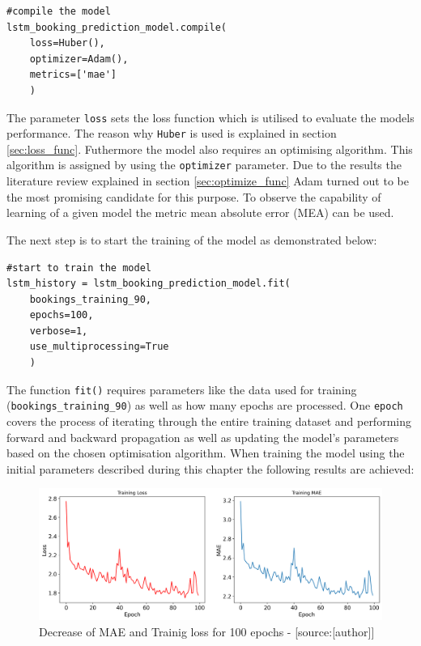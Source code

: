 \begin{lstlisting}
#compile the model 
lstm_booking_prediction_model.compile(
    loss=Huber(),
    optimizer=Adam(),
    metrics=['mae']
	)
\end{lstlisting}
The parameter \verb|loss| sets the loss function which is utilised to evaluate the models performance. The reason why \verb|Huber| is used is explained in section \ref{sec:loss_func}. Futhermore the model also requires an optimising algorithm. This algorithm is assigned by using the \verb|optimizer| parameter. Due to the results the literature review explained in section \ref{sec:optimize_func} Adam turned out to be the most promising candidate for this purpose. To observe the capability of learning of a given model the metric mean absolute error (MEA) can be used. 

The next step is to start the training of the model as demonstrated below:
\begin{lstlisting}
#start to train the model
lstm_history = lstm_booking_prediction_model.fit(
    bookings_training_90,
    epochs=100,
    verbose=1,
    use_multiprocessing=True
	)
\end{lstlisting}
The function \verb|fit()| requires parameters like the data used for training (\verb|bookings_training_90|) as well as how many epochs are processed. One \verb|epoch| covers the process of iterating through the entire training dataset and performing forward and backward propagation as well as updating the model's parameters based on the chosen optimisation algorithm.
\newline
When training the model using the initial parameters described during this chapter the following results are achieved:
\begin{figure}[H]
	\centering
		\includegraphics[width=14cm]{images/lstm_1_paper_training}
	\caption{Decrease of MAE and Trainig loss for 100 epochs - [source:[author]]}
	\label{fig:training_test}
\end{figure}
